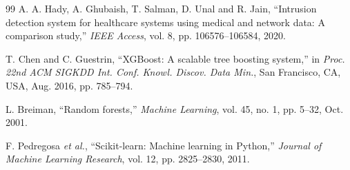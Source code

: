\documentclass[journal,10pt]{IEEEtran}
\begin{document}
\begin{thebibliography}{99}
A. A. Hady, A. Ghubaish, T. Salman, D. Unal and R. Jain,
``Intrusion detection system for healthcare systems using medical and
network data: A comparison study,''
\emph{IEEE Access}, vol. 8, pp. 106576--106584, 2020.

T. Chen and C. Guestrin,
``XGBoost: A scalable tree boosting system,''
in \emph{Proc. 22nd ACM SIGKDD Int. Conf. Knowl. Discov. Data Min.},
San Francisco, CA, USA, Aug. 2016, pp. 785--794.

L. Breiman,
``Random forests,''
\emph{Machine Learning}, vol. 45, no. 1, pp. 5--32, Oct. 2001.

F. Pedregosa \emph{et al.},
``Scikit-learn: Machine learning in Python,''
\emph{Journal of Machine Learning Research}, vol. 12, pp. 2825--2830,
2011.

\end{thebibliography}
\end{document}
